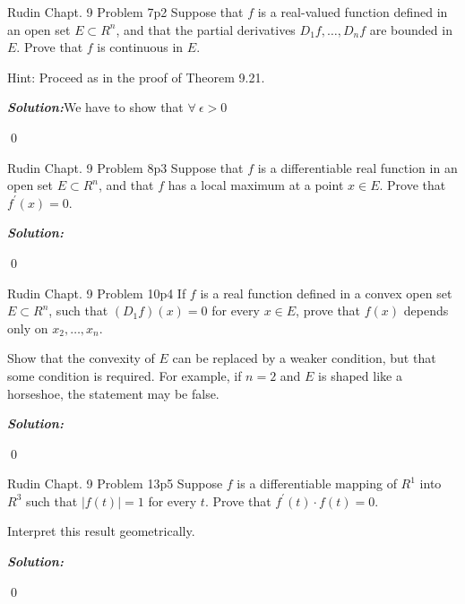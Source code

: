 \documentclass[a4paper, 11pt]{article}
\newcommand{\Qed}{\begin{flushright}\qed\end{flushright}}
\newcommand{\sol}[1]{\begin{solution}#1\end{solution}\Qed}
\newcommand{\parinn}{\setlength{\parindent}{1cm}}
\newenvironment{solution}
{\textbf{\textit{Solution:}}\setlength{\parindent}{1cm}}
{}
\begin{document}
	
	
	\begin{problem}{Rudin Chapt. 9 Problem 7}{p2%
		}
		Suppose that $f$ is a real-valued function defined in an open set $E \subset R^{n}$, and that the partial derivatives $D_{1} f, \ldots, D_{n} f$ are bounded in $E$. Prove that $f$ is continuous in $E$.\parinn
		
		Hint: Proceed as in the proof of Theorem 9.21.
	\end{problem}
	
	\sol{We have to show that $\forall\ \epsilon>0$}
	
	
	
	\begin{problem}{Rudin Chapt. 9 Problem 8}{p3%
		}
		Suppose that $f$ is a differentiable real function in an open set $E \subset R^{n}$, and that $f$ has a local maximum at a point $x \in E$. Prove that $f^{\prime}(x)=0$.
	\end{problem}
	
	\sol{}
	
	
	
	\begin{problem}{Rudin Chapt. 9 Problem 10}{p4%
		}
				If $f$ is a real function defined in a convex open set $E \subset R^{n}$, such that $\left(D_{1} f\right)(x)=0$ for every $x \in E$, prove that $f(x)$ depends only on $x_{2}, \ldots, x_{n}$.\parinn
				
				Show that the convexity of $E$ can be replaced by a weaker condition, but that some condition is required. For example, if $n=2$ and $E$ is shaped like a horseshoe, the statement may be false.
	\end{problem}
	
	\sol{}
	
	
	
	\begin{problem}{Rudin Chapt. 9 Problem 13}{p5%
		}
		Suppose $f$ is a differentiable mapping of $R^{1}$ into $R^{3}$ such that $|f(t)|=1$ for every $t$. Prove that $f^{\prime}(t) \cdot f(t)=0$.\parinn
		
		Interpret this result geometrically.
	\end{problem}
	
	\sol{}

	
\end{document}
